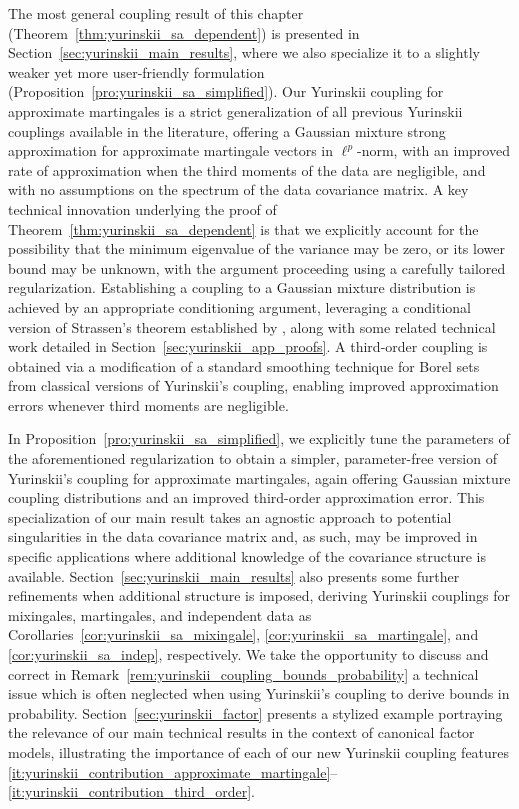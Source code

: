 \documentclass[11pt,lof]{puthesis}
\theoremstyle{break}
\theoremstyle{proof}
\begin{document}
The most general coupling result of this chapter
(Theorem~\ref{thm:yurinskii_sa_dependent}) is presented in
Section~\ref{sec:yurinskii_main_results}, where we also specialize it to a
slightly weaker yet more user-friendly formulation
(Proposition~\ref{pro:yurinskii_sa_simplified}). Our Yurinskii coupling for
approximate martingales is a strict generalization of all previous Yurinskii
couplings available in the literature, offering a Gaussian mixture strong
approximation for approximate martingale vectors in $\ell^p$-norm, with an
improved rate of approximation when the third moments of the data are
negligible, and with no assumptions on the spectrum of the data covariance
matrix. A key technical innovation underlying the proof of
Theorem~\ref{thm:yurinskii_sa_dependent} is that we explicitly account for the
possibility that the minimum eigenvalue of the variance may be zero, or its
lower bound may be unknown, with the argument proceeding using a carefully
tailored regularization. Establishing a coupling to a Gaussian mixture
distribution is achieved by an appropriate conditioning argument, leveraging a
conditional version of Strassen's theorem established by
\citet{chen2020jackknife}, along with some related technical work detailed in
Section~\ref{sec:yurinskii_app_proofs}.
A third-order coupling is obtained via
a modification of a standard smoothing technique for Borel sets from classical
versions of Yurinskii's coupling, enabling improved approximation errors
whenever third moments are negligible.

In Proposition~\ref{pro:yurinskii_sa_simplified}, we explicitly tune the
parameters of
the aforementioned regularization to obtain a simpler, parameter-free version
of Yurinskii's coupling for approximate martingales, again offering Gaussian
mixture coupling distributions and an improved third-order approximation error.
This specialization of our main result takes an agnostic approach to potential
singularities in the data covariance matrix and, as such, may be improved in
specific applications where additional knowledge of the covariance structure is
available. Section~\ref{sec:yurinskii_main_results} also presents some further
refinements when additional structure is imposed, deriving Yurinskii couplings
for mixingales, martingales, and independent data as
Corollaries~\ref{cor:yurinskii_sa_mixingale},
\ref{cor:yurinskii_sa_martingale}, and
\ref{cor:yurinskii_sa_indep}, respectively. We take the opportunity to discuss
and correct
in Remark~\ref{rem:yurinskii_coupling_bounds_probability} a technical issue
which is
often neglected \citep{pollard2002user, li2020uniform} when using Yurinskii's
coupling to derive bounds in probability. Section~\ref{sec:yurinskii_factor}
presents a
stylized example portraying the relevance of our main technical results in the
context of canonical factor models, illustrating the importance of each of our
new Yurinskii coupling features
\ref{it:yurinskii_contribution_approximate_martingale}--%
\ref{it:yurinskii_contribution_third_order}.
\end{document}
